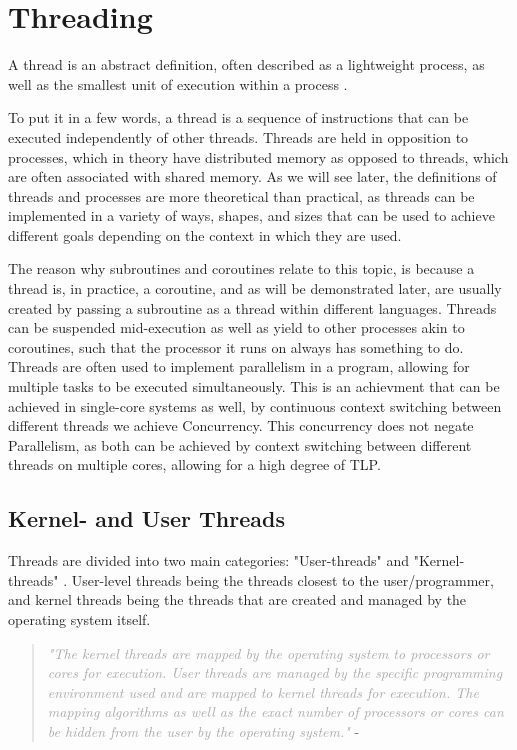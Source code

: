 \documentclass[12pt,a4paper]{article}
\begin{document}
\section{Threading}

A thread is an abstract definition, often described as a lightweight process, as well as the smallest unit of execution within a process \parencite{Rauber2023}. 

To put it in a few words, a thread is a sequence of instructions that can be executed independently of other threads. Threads are held in opposition to processes, which in theory have distributed memory\parencite[p. 4, 27]{Rauber2023} as opposed to threads, which are often associated with shared memory. As we will see later, the definitions of threads and processes are more theoretical than practical, as threads can be implemented in a variety of ways, shapes, and sizes that can be used to achieve different goals depending on the context in which they are used.

The reason why subroutines and coroutines relate to this topic, is because a thread is, in practice, a coroutine, and as will be demonstrated later, are usually created by passing a subroutine as a thread within different languages. Threads can be suspended mid-execution as well as yield to other processes akin to coroutines, such that the processor it runs on always has something to do. Threads are often used to implement parallelism in a program\parencite[p. 27]{Rauber2023}, allowing for multiple tasks to be executed simultaneously. This is an achievment that can be achieved in single-core systems as well, by continuous context switching between different threads\parencite{Rauber2023} we achieve Concurrency. This concurrency does not negate Parallelism, as both can be achieved by context switching between different threads on multiple cores, allowing for a high degree of TLP.

\subsection{Kernel- and User Threads}

Threads are divided into two main categories: "User-threads" and "Kernel-threads" \parencite[p. 27]{Rauber2023}. User-level threads being the threads closest to the user/programmer, and kernel threads being the threads that are created and managed by the operating system itself.

\begin{quote}
    \textit{\textcolor{darkgray}{"The kernel threads are mapped by the operating system to processors or cores for execution. User threads are managed by the specific programming environment used and are mapped to kernel threads for execution. The mapping algorithms as well as the exact number of processors or cores can be hidden from the user by the operating system."}} - \parencite[p. 27]{Rauber2023}
\end{quote}
\end{document}
